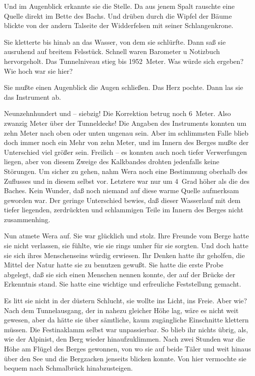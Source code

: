Und im Augenblick erkannte sie die Stelle. Da aus jenem Spalt
rauschte eine Quelle direkt im Bette des Bachs. Und drüben durch
die Wipfel der Bäume blickte von der andern Talseite der
Widderfelsen mit seiner Schlangenkrone.

Sie kletterte bis hinab an das Wasser, von dem sie schlürfte. Dann
saß sie ausruhend auf breitem Felsstück. Schnell waren Barometer u
Notizbuch hervorgeholt. Das Tunnelniveau stieg bis 1952~Meter. Was
würde sich ergeben? Wie hoch war sie hier?

Sie mußte einen Augenblick die Augen schließen. Das Herz pochte.
Dann las sie das Instrument ab.

Neunzehnhundert und – siebzig! Die Korrektion betrug noch 6~Meter.
Also zwanzig Meter über der Tunneldecke! Die Angaben des
Instruments konnten um zehn Meter nach oben oder unten ungenau
sein. Aber im schlimmsten Falle blieb doch immer noch ein Mehr von
zehn Meter, und im Innern des Berges mußte der Unterschied viel
größer sein. Freilich – es konnten auch noch tiefer Verwerfungen
liegen, aber von diesem Zweige des Kalkbandes drohten jedenfalls
keine Störungen. Um sicher zu gehen, nahm Wera noch eine Bestimmung
oberhalb des Zuflusses und in diesem selbst vor. Letztere war nur
um 4~Grad höher als die des Baches. Kein Wunder, daß noch niemand
auf diese warme Quelle aufmerksam geworden war. Der geringe
Unterschied bewies, daß dieser Wasserlauf mit dem tiefer liegenden,
zerdrückten und schlammigen Teile im Innern des Berges nicht
zusammenhing.

Nun atmete Wera auf. Sie war glücklich und stolz. Ihre Freunde vom
Berge hatte sie nicht verlassen, sie fühlte, wie sie rings umher
für sie sorgten. Und doch hatte sie sich ihres Menschenseins würdig
erwiesen. Ihr Denken hatte ihr geholfen, die Mittel der Natur hatte
sie zu benutzen gewußt. Sie hatte die erste Probe abgelegt, daß sie
sich einen Menschen nennen konnte, der auf der Brücke der
Erkenntnis stand. Sie hatte eine wichtige und erfreuliche
Feststellung gemacht.

Es litt sie nicht in der düstern Schlucht, sie wollte ins Licht,
ins Freie. Aber wie? Nach dem Tunnelausgang, der in nahezu gleicher
Höhe lag, wäre es nicht weit gewesen, aber da hätte sie über
sämtliche, kaum zugängliche Einschnitte klettern müssen. Die
Festinaklamm selbst war unpassierbar. So blieb ihr nichts übrig,
als, wie der Alpinist, den Berg wieder hinaufzuklimmen. Nach zwei
Stunden war die Höhe am Flügel des Berges gewonnen, von wo sie auf
beide Täler und weit hinaus über den See und die Bergzacken
jenseits blicken konnte. Von hier vermochte sie bequem nach
Schmalbrück hinabzusteigen.

